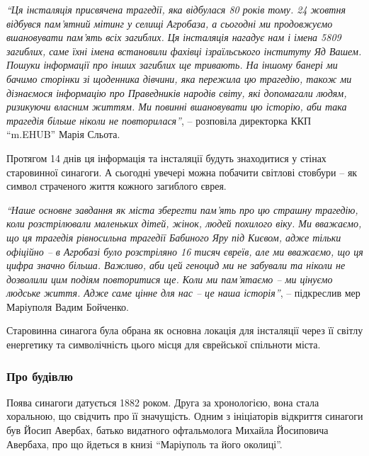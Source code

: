 \emph{\enquote{Ця інсталяція присвячена трагедії, яка відбулася 80 років тому. 24 жовтня
відбувся пам'ятний мітинг у селищі Агробаза, а сьогодні ми продовжуємо
вшановувати пам'ять всіх загиблих. Ця інсталяція нагадує нам і імена 5809
загиблих, саме їхні імена встановили фахівці ізраїльського інституту Яд Вашем.
Пошуки інформації про інших загиблих ще тривають. На іншому банері ми бачимо
сторінки зі щоденника дівчини, яка пережила цю трагедію, також ми дізнаємося
інформацію про Праведників народів світу, які допомагали людям, ризикуючи
власним життям. Ми повинні вшановувати цю історію, аби така трагедія більше
ніколи не повторилася}}, – розповіла директорка ККП \enquote{m.EHUB} Марія Сльота.

Протягом 14 днів ця інформація та інсталяції будуть знаходитися у стінах
старовинної синагоги. А сьогодні увечері можна побачити світлові стовбури – як
символ страченого життя кожного загиблого єврея.


\emph{\enquote{Наше основне завдання як міста зберегти пам'ять про цю страшну трагедію, коли
розстрілювали маленьких дітей, жінок, людей похилого віку. Ми вважаємо, що ця
трагедія рівносильна трагедії Бабиного Яру під Києвом, адже тільки офіційно – в
Агробазі було розстріляно 16 тисяч євреїв, але ми вважаємо, що ця цифра значно
більша. Важливо, аби цей геноцид ми не забували та ніколи не дозволили цим
подіям повторитися ще. Коли ми пам'ятаємо – ми цінуємо людське життя. Адже саме
цінне для нас – це наша історія}}, – підкреслив мер Маріуполя Вадим Бойченко.

Старовинна синагога була обрана як основна локація для інсталяції через її
світлу енергетику та символічність цього місця для єврейської спільноти міста.


\subsubsection{Про будівлю}

Поява синагоги датується 1882 роком. Друга за хронологією, вона стала
хоральною, що свідчить про її значущість. Одним з ініціаторів відкриття
синагоги був Йосип Авербах, батько видатного офтальмолога Михайла Йосиповича
Авербаха, про що йдеться в книзі \enquote{Маріуполь та його околиці}.

